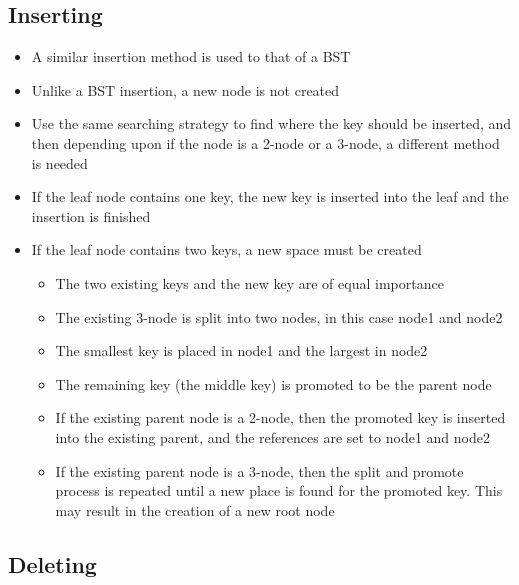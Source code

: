 \subsection*{Inserting}

\begin{itemize}
  \item A similar insertion method is used to that of a BST
  \item Unlike a BST insertion, a new node is not created
  \item Use the same searching strategy to find where the key should be inserted, and then depending upon if the node is a 2-node or a 3-node, a different method is needed
  \item If the leaf node contains one key, the new key is inserted into the leaf and the insertion is finished
  \item If the leaf node contains two keys, a new space must be created
  \begin{itemize}
    \item The two existing keys and the new key are of equal importance
    \item The existing 3-node is split into two nodes, in this case node1 and node2
    \item The smallest key is placed in node1 and the largest in node2
    \item The remaining key (the middle key) is promoted to be the parent node
    \item If the existing parent node is a 2-node, then the promoted key is inserted into the existing parent, and the references are set to node1 and node2
    \item If the existing parent node is a 3-node, then the split and promote process is repeated until a new place is found for the promoted key. This may result in the creation of a new root node
  \end{itemize}
\end{itemize}

\subsection*{Deleting}

